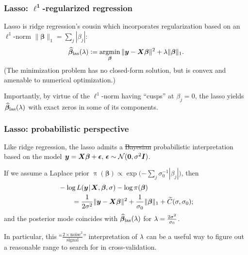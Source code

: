 \documentclass[18pt]{beamer}
\newcommand{\defineTightSpacing}{%
	\setlength{\abovedisplayskip}{.25\baselineskip}%
	\setlength{\belowdisplayskip}{.25\baselineskip}%
}
\newcommand{\given}{\thinnerspace | \thinnerspace}
\newcommand{\defeq}{\vcentcolon =} %
\DeclareMathOperator*{\argmin}{argmin}
\newcommand{\thinnerspace}{\mskip.5\thinmuskip}
\newcommand{\iidSim}{\mathrel{\raisebox{-.3ex}{$\overset{\text{i.i.d.}}{\sim}$}}}
\newcommand{\normalDist}{\mathcal{N}}
\newcommand{\density}{\operatorname{\pi}}
\newcommand{\likelihood}{L}
\newcommand{\by}{\bm{y}}
\newcommand{\bX}{\bm{X}}
\newcommand{\bbeta}{\bm{\beta}}
\newcommand{\Id}{\bm{I}}
\begin{document}
\begin{frame}
\frametitle{Lasso: $\bm{\ell^1}$-regularized regression}
Lasso is ridge regression's cousin which incorporates regularization based on an $\ell^1$-norm $\| \bbeta \|_1 = \sum_j | \beta_j |$: 
\begin{equation*} \defineTightSpacing%
\widehat{\bbeta}_{\mathrm{las}}(\penaltyParam)
	\defeq \argmin_{\bbeta} \| \by - \bX \bbeta \|^2 + \penaltyParam \| \bbeta \|_1.
\end{equation*}
\pause%
(The minimization problem has no closed-form solution, but is convex and amenable to numerical optimization.)

\pause
\smallskip
Importantly, by virtue of the $\ell^1$-norm having ``cusps'' at $\beta_j = 0$, the lasso yields $\thinnerspace \widehat{\bbeta}_{\mathrm{las}}(\penaltyParam) \thinnerspace$ with exact zeros in some of its components. 
\end{frame}

\newcommand{\laplaceDist}{\mathrm{Laplace}}
\begin{frame}
\frametitle{Lasso: probabilistic perspective}
Like ridge regression, the lasso admits a \st{Bayesian} probabilistic interpretation based on the model $\thinnerspace \by = \bX \bbeta + \bm{\epsilon}, \, \bm{\epsilon} \sim \normalDist(\bm{0}, \sigma^2 \Id)$.

\pause
\smallskip
If we assume a Laplace prior $\density(\bbeta) \propto \exp\!\big( {- \sum_j} \sigma_0^{-1} | \beta_j | \big)$, then %
\begin{equation*} \defineTightSpacing%
\begin{aligned}
&- \log \likelihood(\by \given \bX, \bbeta, \sigma) - \log \density(\bbeta)\\
	&\hspace*{2em}= \frac{1}{2 \sigma^2} \| \by - \bX \bbeta \|^2 + \frac{1}{\sigma_0} \| \bbeta \|_1 + \widetilde{C}(\sigma, \sigma_0);
\end{aligned}
\end{equation*}
and the posterior mode coincides with $\widehat{\bbeta}_{\mathrm{las}}(\penaltyParam)$ for $\lambda = \frac{2 \sigma^2}{\sigma_0}$.

\pause
\smallskip
In particular, this ``$\frac{2 \times \mathrm{noise}^2}{\mathrm{signal}}$'' interpretation of $\lambda$ can be a useful way to figure out a reasonable range to search for in cross-validation.
\end{frame}
\end{document}
